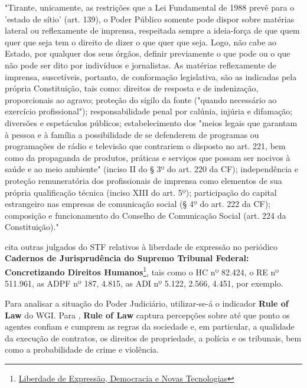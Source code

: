 \noindent
\begin{flushleft}
\setlength{\leftskip}{4cm}
\small
"Tirante, unicamente, as restrições que a Lei Fundamental de 1988 prevê para o 'estado de sítio' (art. 139), o Poder Público somente pode dispor sobre matérias lateral ou reflexamente de imprensa, respeitada sempre a ideia-força de que quem quer que seja tem o direito de dizer o que quer que seja. Logo, não cabe ao Estado, por qualquer dos seus órgãos, definir previamente o que pode ou o que não pode ser dito por indivíduos e jornalistas. As matérias reflexamente de imprensa, suscetíveis, portanto, de conformação legislativa, são as indicadas pela própria Constituição, tais como: direitos de resposta e de indenização, proporcionais ao agravo; proteção do sigilo da fonte ("quando necessário ao exercício profissional"); responsabilidade penal por calúnia, injúria e difamação; diversões e espetáculos
públicos; estabelecimento dos "meios legais que garantam à pessoa e à família a possibilidade de se defenderem de programas ou programações de rádio e televisão que contrariem o disposto no art. 221, bem como da propaganda de produtos, práticas e serviços que possam ser nocivos à saúde e ao meio ambiente" (inciso II do § 3º
do art. 220 da CF); independência e proteção remuneratória dos profissionais de imprensa como elementos de sua própria qualificação técnica (inciso XIII do art. 5º); participação do capital estrangeiro nas empresas de comunicação social (§ 4º do
art. 222 da CF); composição e funcionamento do Conselho de Comunicação Social (art. 224 da Constituição)." \cite{ado26}
\end{flushleft}

\cite{stf_caderno_liberdadeexpressao} cita outras julgados do STF relativos à liberdade de expressão no periódico \textbf{Cadernos de Jurisprudência do Supremo Tribunal Federal: Concretizando Direitos Humanos}\footnote{\href{https://www.cnj.jus.br/wp-content/uploads/2024/12/cadernos-stf-liberdadeexpressaoenovastecnologias.pdf}{Liberdade de Expressão, Democracia e Novas Tecnologias}}, tais como o HC nº 82.424, o RE nº 511.961, as ADPF nº 187, 4.815, as ADI nº 5.122, 2.566, 4.451, por exemplo.

Para analisar a situação do Poder Judiciário, utilizar-se-á o indicador \textbf{Rule of Law} do WGI. Para \cite{wgi_dados}, \textbf{Rule of Law} captura percepções sobre até que ponto os agentes confiam e cumprem as regras da sociedade e, em particular, a qualidade da execução de contratos, os direitos de propriedade, a polícia e os tribunais, bem como a probabilidade de crime e violência.
 
